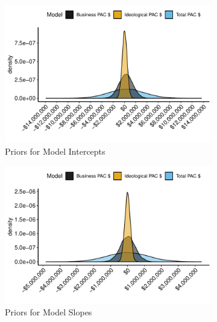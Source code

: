 \documentclass[12pt]{article}
\begin{document}
\begin{appendices}
\begin{figure}[!htb]
    \centering
    \begin{subfigure}[b]{0.45\textwidth}
        \centering
        \includegraphics[width=\linewidth]{pac_int.pdf}
        \caption{Priors for Model Intercepts}
    \end{subfigure}
    \begin{subfigure}[b]{0.45\textwidth}
        \centering
        \includegraphics[width=\linewidth]{pac_slopes.pdf}
        \caption{Priors for Model Slopes}
    \end{subfigure}
    \begin{subfigure}[b]{0.45\textwidth}
    	\centering

\end{subfigure}
\end{figure}
\end{appendices}
\end{document}
